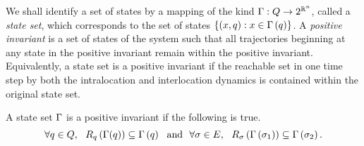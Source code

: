 We shall identify a set of states by a mapping of the kind
$\Gamma:Q\rightarrow 2^{\mathbb{R}^n}$, called a \emph{state
  set}, which corresponds to the set of states
$\left\{\left(x,q\right):x\in\Gamma\left(q\right)\right\}$.  A \emph{positive
invariant} is a set of states of the system such that all trajectories
beginning at any state in the positive invariant remain within the
positive invariant.  Equivalently, a state set is a positive invariant
if the reachable set in one time step by both the intralocation and
interlocation dynamics is contained within the original state set.
\begin{definition}
A state set $\Gamma$ is a positive invariant if
the following is true.
\[
 \forall q\in Q,~~R_{q}\left(\Gamma(q)\right) \subseteq \Gamma\left(q\right)~\label{eqn:pi1}~\text{and}~~
 \forall\sigma\in E,~~R_{\sigma}\left(\Gamma\left(\sigma_{1}\right)\right) \subseteq
  \Gamma\left(\sigma_{2}\right).
\]
\end{definition}
